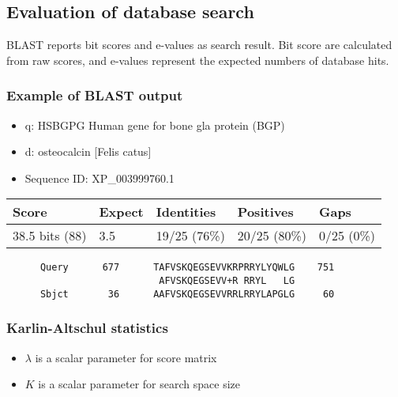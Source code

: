 %
%

%
%
\subsection{Evaluation of database search}
BLAST reports bit scores and e-values as search result. Bit score are calculated from raw scores, and e-values represent the expected numbers of database hits.

%
%
\subsubsection*{Example of BLAST output} 
\begin{itemize}
\item q: HSBGPG Human gene for bone gla protein (BGP)
\item d: osteocalcin [Felis catus]
\item Sequence ID: XP\_003999760.1
\end{itemize}

\begin{table}[H]
\centering
\begin{tabular}{lllll}
\textbf{Score} & \textbf{Expect} & \textbf{Identities} & \textbf{Positives} & \textbf{Gaps} \\ \hline
38.5 bits (88)  & 3.5             & 19/25 (76\%)         & 20/25 (80\%)        & 0/25 (0\%)    
\end{tabular}
\end{table}

\begin{verbatim}
      Query      677      TAFVSKQEGSEVVKRPRRYLYQWLG    751
                           AFVSKQEGSEVV+R RRYL   LG	
      Sbjct       36      AAFVSKQEGSEVVRRLRRYLAPGLG     60
\end{verbatim}

%
%
\subsubsection*{Karlin-Altschul statistics} 
\begin{itemize}
\item $\lambda$ is a scalar parameter for score matrix 
\item $K$ is a scalar parameter for search space size
\end{itemize}

